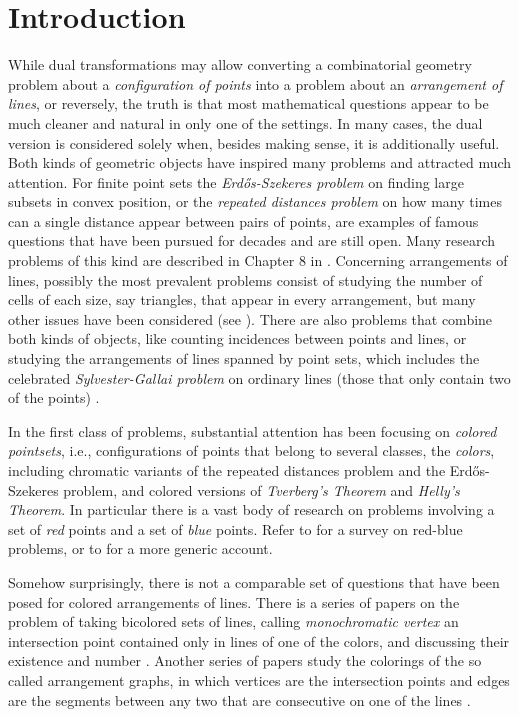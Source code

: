 \documentclass[11pt,a4paper]{article}
\begin{document}
\section{Introduction}
While dual transformations may allow converting a combinatorial geometry problem about a \emph{configuration of points} into a problem about an \emph{arrangement of lines}, or reversely, the truth is that most mathematical questions appear to be much cleaner and natural in only one of the settings. In many cases, the dual version is considered solely when, besides making sense, it is additionally useful. Both kinds of geometric objects have inspired many problems and attracted much attention. For finite point sets the \emph{Erd\H{o}s-Szekeres problem} on finding large subsets in convex position, or the \emph{repeated distances problem} on how many times can a single distance appear between pairs of points, are examples of famous questions that have been pursued for decades and are still open. Many research problems of this kind are described in Chapter 8 in \cite{BMP}. Concerning arrangements of lines, possibly the most prevalent problems consist of studying the number of cells of each size, say triangles, that appear in every arrangement, but many other issues have been considered (see \cite{Fe,Gru1,Gru2}). There are also problems that combine both kinds of objects, like counting incidences between points and lines, or studying the arrangements of lines spanned by point sets, which includes the celebrated \emph{Sylvester-Gallai problem} on ordinary lines (those that only contain two of the points) \cite{BMP}.

In the first class of problems, substantial attention has been focusing on \emph{colored pointsets}, i.e., configurations of points that belong to several classes, the \emph{colors}, including chromatic variants of the repeated distances problem and the Erd\H{o}s-Szekeres problem, and colored versions of \emph{Tverberg's Theorem} and \emph{Helly's Theorem}. In particular there is a vast body of research on problems involving a set of \emph{red} points and a set of \emph{blue} points. Refer to \cite{KK} for a survey on red-blue problems, or to \cite{BMP} for a more generic account.

Somehow surprisingly, there is not a comparable set of questions that have been posed for colored arrangements of lines. There is a series of papers on the problem of taking bicolored sets of lines, calling \emph{monochromatic vertex} an intersection point contained only in lines of one of the colors, and discussing their existence and number \cite{Gru3,Gru4,Mo}. Another series of papers study the colorings of the so called arrangement graphs, in which vertices are the intersection points and edges are the segments between any two that are consecutive on one of the lines \cite{BEW,FHNS}.
\end{document}
